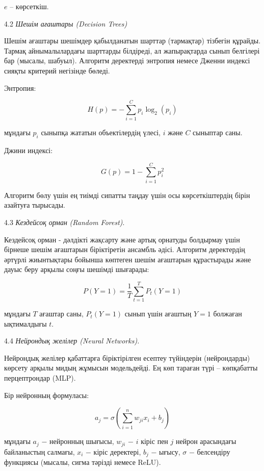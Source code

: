 \begin{multicols}{2}
\(e\) -- көрсеткіш.

4.2 \emph{Шешім ағаштары (Decision Trees)}

Шешім ағаштары шешімдер қабылданатын шарттар (тармақтар) тізбегін
құрайды. Тармақ айнымалылардағы шарттарды білдіреді, ал жапырақтарда
сынып белгілері бар (мысалы, шабуыл). Алгоритм деректерді энтропия
немесе Дженни индексі сияқты критерий негізінде бөледі.

Энтропия:

\begin{equation}
H(p) = - \sum_{i = 1}^{C}{p_{i}\log_{2}(p_{i})}
\end{equation}

мұндағы \(p_{i}\) сыныпқа жататын объектілердің үлесі, \(i\) және \(C\)
сыныптар саны.

Джини индексі:

\begin{equation}
G(p) = 1 - \sum_{i = 1}^{C}p_{i}^{2}
\end{equation}

Алгоритм бөлу үшін ең тиімді сипатты таңдау үшін осы көрсеткіштердің
бірін азайтуға тырысады.

4.3 \emph{Кездейсоқ орман} \emph{(Random Forest)}.

Кездейсоқ орман - дәлдікті жақсарту және артық орнатуды болдырмау үшін
бірнеше шешім ағаштарын біріктіретін ансамбль әдісі. Алгоритм
деректердің әртүрлі жиынтықтары бойынша көптеген шешім ағаштарын
құрастырады және дауыс беру арқылы соңғы шешімді шығарады:

\begin{equation}
P(Y = 1) = \frac{1}{T}\sum_{t = 1}^{T}{P_{t}(Y = 1)}
\end{equation}

мұндағы \(T\) ағаштар саны, \(P_{t}(Y = 1)\) сынып үшін ағаштың
\(Y = 1\) болжаған ықтималдығы \(t\).

4.4 \emph{Нейрондық желілер (Neural Networks).}

Нейрондық желілер қабаттарға біріктірілген есептеу түйіндерін
(нейрондарды) көрсету арқылы мидың жұмысын модельдейді. Ең көп тараған
түрі -- көпқабатты перцептрондар (MLP).

Бір нейронның формуласы:

\begin{equation}
a_{j} = \sigma\left( \sum_{i = 1}^{n}{w_{ji}x_{i} + b_{j}} \right)
\end{equation}

мұндағы \(a_{j}\) − нейронның шығысы, \(w_{ji}\) − \(i\) кіріс пен \(j\)
нейрон арасындағы байланыстың салмағы, \(x_{i}\) − кіріс деректері,
\(b_{j}\) − ығысу, \(\sigma\) − белсендіру функциясы (мысалы, сигма
тәрізді немесе ReLU).


\end{multicols}
